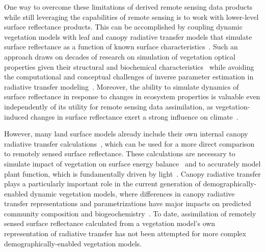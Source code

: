 One way to overcome these limitations of derived remote sensing data products while still leveraging the capabilities of remote sensing is to work with lower-level surface reflectance products.
This can be accomplished by coupling dynamic vegetation models with leaf and canopy radiative transfer models that simulate surface reflectance as a function of known surface characteristics~\citep{knorr2001assimilation, nouvellon2001coupling, quaife2008assimilating}.
Such an approach draws on decades of research on simulation of vegetation optical properties given their structural and biochemical characteristics~\citep{dickinson_1983_land, sellers1985canopy, verhoef1984light, lewis2007spectral, jacquemoud2009prospect, pinty2004synergy, widlowski2007third, widlowski2015fourth, hogan_2018_fast} while avoiding the computational and conceptual challenges of inverse parameter estimation in radiative transfer modeling~\citep{combal2003retrieval, lewis2007spectral}.
Moreover, the ability to simulate dynamics of surface reflectance in response to changes in ecosystem properties is valuable even independently of its utility for remote sensing data assimilation, as vegetation-induced changes in surface reflectance exert a strong influence on climate~\citep{bonan2008forests, swann2010changes, swann2012midlatitude}.

However, many land surface models already include their own internal canopy radiative transfer calculations~\citep{dickinson1983land, sellers1985canopy}, which can be used for a more direct comparison to remotely sensed surface reflectance.
These calculations are necessary to simulate impact of vegetation on surface energy balance~\citep{bonan2008forests} and to accurately model plant function, which is fundamentally driven by light~\citep{hikosaka1995model, robakowski_2004_growth, niinemets2016withincanopy, keenan2016global}.
Canopy radiative transfer plays a particularly important role in the current generation of demographically-enabled dynamic vegetation models, where differences in canopy radiative transfer representations and parametrizations have major impacts on predicted community composition and biogeochemistry~\citep{loew_2014_do, fisher2018vegetation, viskari_2019_influence}.
To date, assimilation of remotely sensed surface reflectance calculated from a vegetation model's own representation of radiative transfer has not been attempted for more complex demographically-enabled vegetation models.

